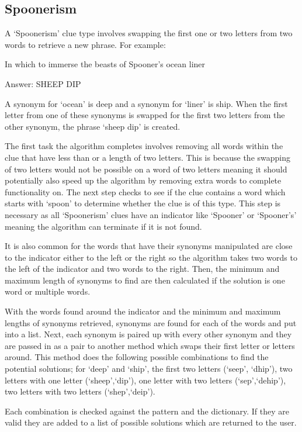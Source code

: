 \subsection{Spoonerism}

A `Spoonerism' clue type involves swapping the first one or two letters 
from two words to retrieve a new phrase. For example:

In which to immerse the beasts of Spooner's ocean liner

Answer: SHEEP DIP

A synonym for `ocean' is deep and a synonym for `liner' is ship. When 
the first letter from one of these synonyms is swapped for the first two 
letters from the other synonym, the phrase `sheep dip' is created.

The first task the algorithm completes involves removing all words within 
the clue that have less than or a length of two letters. This is because 
the swapping of two letters would not be possible on a word of two letters 
meaning it should potentially also speed up the algorithm by removing 
extra words to complete functionality on. The next step checks to see 
if the clue contains a word which starts with `spoon' to determine whether 
the clue is of this type. This step is necessary as all `Spoonerism' clues have
an indicator like `Spooner' or `Spooner's' meaning the algorithm can 
terminate if it is not found. 

It is also common for the words that have their synonyms manipulated are 
close to the indicator either to the left or the right so the algorithm takes 
two words to the left of the indicator and two words to the right. Then, 
the minimum and maximum length of synonyms to find are then calculated 
if the solution is one word or multiple words. 

With the words found around the indicator and the minimum and maximum 
lengths of synonyms retrieved, synonyms are found for each of the 
words and put into a list. Next, each synonym is paired up with every 
other synonym and they are passed in as a pair to another method which 
swaps their first letter or letters around. This method does the following 
possible combinations to find the potential solutions; for `deep' and `ship',
the first two letters (`seep', `dhip'), two letters with one letter (`sheep',`dip'), 
one letter with two letters (`sep',`dehip'), two letters with two letters (`shep',`deip'). 

Each combination is checked against the pattern and the dictionary. If they are 
valid they are added to a list of possible solutions which are returned to the user. 


